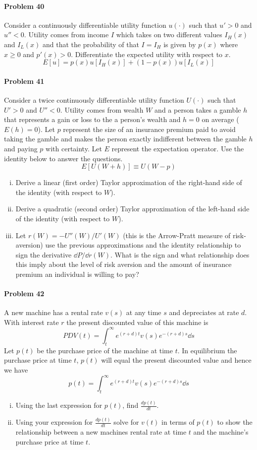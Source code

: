 \documentclass[a4paper, 11pt]{article}
\begin{document}
\paragraph{Problem 40}
Consider a continuously differentiable utility function $u(\cdot)$ such that $u'>0$ and $u'' < 0$.
Utility comes from income $I$ which takes on two different values $I_H(x)$ and $I_L(x)$ and that the probability of that $I=I_H$ is given by $p(x)$ where $x\geq 0$ and $p'(x)>0$.
Differentiate the expected utility with respect to $x$.
\[
	E[u] = p(x)u[I_H(x)] + (1-p(x))u[I_L(x)]
\]


\paragraph{Problem 41}
Consider a twice continuously differentiable utility function $U(\cdot)$ such that $U'>0$ and $U''< 0$.
Utility comes from wealth $W$ and a person takes a gamble $h$ that represents a gain or loss to the a person's wealth and $h=0$ on average ($E(h)=0$).
Let $p$ represent the size of an insurance premium paid to avoid taking the gamble and makes the person exactly indifferent between the gamble $h$ and paying $p$ with certainty.
Let $E$ represent the expectation operator.
Use the identity below to answer the questions.
\[
	E[U(W + h)] \equiv U(W-p)
\]
\begin{enumerate}[(i)]
	\item Derive a linear (first order) Taylor approximation of the right-hand side of the identity (with respect to $W$).
	\item Derive a quadratic (second order) Taylor approximation of the left-hand side of the identity (with respect to $W$).
	\item Let $r(W) = -U''(W)/U'(W)$ (this is the Arrow-Pratt measure of risk-aversion) use the previous approximations and the identity relationship to sign the derivative $\dd P / \dd r(W)$.  What is the sign and what relationship does this imply about the level of risk aversion and the amount of insurance premium an individual is willing to pay?
\end{enumerate}


\paragraph{Problem 42}
A new machine has a rental rate $v(s)$ at any time $s$ and depreciates at rate $d$.
With interest rate $r$ the present discounted value of this machine is 
\[
	PDV(t) = \int_{t}^{\infty} e^{(r+d)t} v(s) e^{-(r+d)s} \dd s
\]
Let $p(t)$ be the purchase price of the machine at time $t$.
In equilibrium the purchase price at time $t$, $p(t)$ will equal the present discounted value and hence we have
\[
	p(t) = \int_{t}^{\infty} e^{(r+d)t} v(s)e^{-(r+d)s} \dd s
\]
\begin{enumerate}[(i)]
	\item Using the last expression for $p(t)$, find $\frac{dp(t)}{dt}$.
	\item Using your expression for $\frac{dp(t)}{dt}$ solve for $v(t)$ in terms of $p(t)$ to show the relationship between a new machines rental rate at time $t$ and the machine's purchase price at time $t$.
\end{enumerate}
\end{document}
